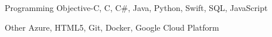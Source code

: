 


\begin{cvskills}


\cvskill
{Programming} %
{Objective-C, C, C\#, Java, Python, Swift, SQL, JavaScript} %


\cvskill
{Other} %
{Azure, HTML5, Git, Docker, Google Cloud Platform} %



\end{cvskills}
